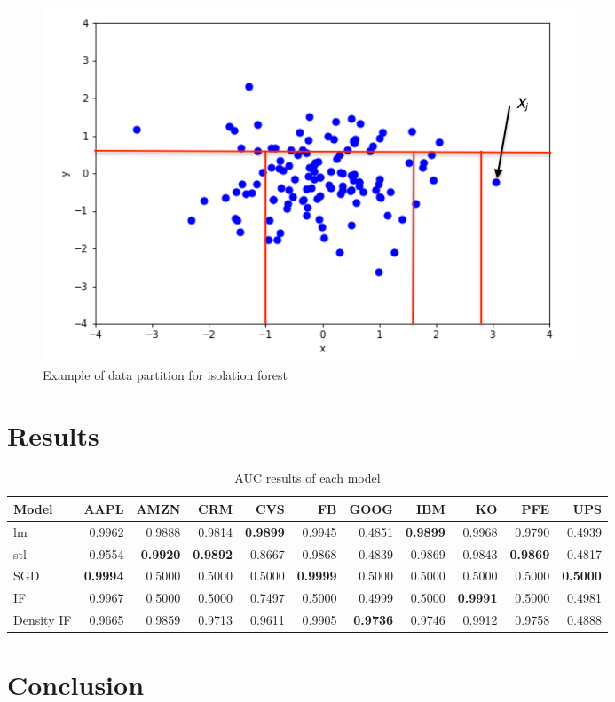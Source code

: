 \documentclass{article}
\begin{document}
\begin{figure}[ht]
    \centering
    \includegraphics[width=.7\textwidth]{../Isolating_an_Anomalous_Point.png}
    \caption{Example of data partition for isolation forest}
    \label{fig:iso_fig}
\end{figure}

\section{Results}


\begin{table}[ht]
    \centering
    \caption{AUC results of each model}
    \small
    \begin{tabular}{l|r|r|r|r|r|r|r|r|r|r}
        \hline
        Model & AAPL & AMZN & CRM & CVS & FB & GOOG & IBM & KO & PFE & UPS\\
        \hline
        lm & 0.9962 & 0.9888 & 0.9814 & \textbf{0.9899} & 0.9945 & 0.4851 & \textbf{0.9899} & 0.9968 & 0.9790 & 0.4939\\
        \hline
        stl & 0.9554 & \textbf{0.9920} & \textbf{0.9892} & 0.8667 & 0.9868 & 0.4839 & 0.9869 & 0.9843 & \textbf{0.9869} & 0.4817\\
        \hline
        SGD & \textbf{0.9994} & 0.5000 & 0.5000 & 0.5000 & \textbf{0.9999} & 0.5000 & 0.5000 & 0.5000 & 0.5000 & \textbf{0.5000}\\
        \hline
        IF & 0.9967 & 0.5000 & 0.5000 & 0.7497 & 0.5000 & 0.4999 & 0.5000 & \textbf{0.9991} & 0.5000 & 0.4981\\
        \hline
        Density IF & 0.9665 & 0.9859 & 0.9713 & 0.9611 & 0.9905 & \textbf{0.9736} & 0.9746 & 0.9912 & 0.9758 & 0.4888\\
        \hline
    \end{tabular}
\end{table}

\section{Conclusion}
\end{document}
